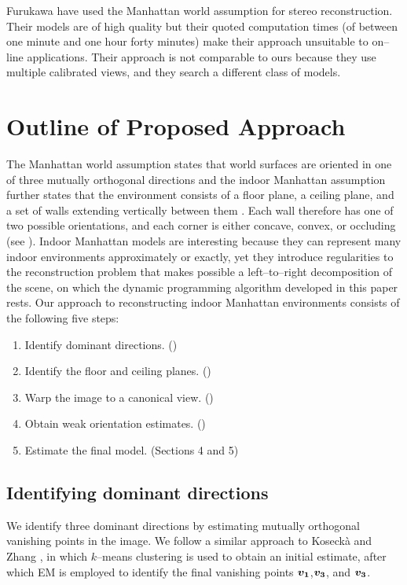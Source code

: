 Furukawa \etal \cite{Furukawa09} have used the Manhattan world
assumption for stereo reconstruction. Their models are of high
quality but their quoted computation times (of between one minute and
one hour forty minutes) make their approach unsuitable to on--line
applications. Their approach is not comparable to ours because they
use multiple calibrated views, and they search a different class of
models.

\section{Outline of Proposed Approach}

The Manhattan world assumption states that world surfaces are oriented
in one of three mutually orthogonal directions \cite{Coughlan99} and
the indoor Manhattan assumption further states that the environment
consists of a floor plane, a ceiling plane, and a set of walls
extending vertically between them \cite{Lee09}. Each wall therefore
has one of two possible orientations, and each corner is either
concave, convex, or occluding (see ). Indoor Manhattan
models are interesting because they can represent many indoor
environments approximately or exactly, yet they introduce regularities
to the reconstruction problem that makes possible a left--to--right
decomposition of the scene, on which the dynamic programming algorithm
developed in this paper rests. Our approach to reconstructing indoor
Manhattan environments consists of the following five steps:
\begin{enumerate}
  \item{Identify dominant directions. ()}
  \item{Identify the floor and ceiling planes. ()}
  \item{Warp the image to a canonical view. ()}
  \item{Obtain weak orientation estimates. ()}
  \item{Estimate the final model. (Sections 4 and 5)}
\end{enumerate}

\subsection{Identifying dominant directions}
\label{sect:vpts}

We identify three dominant directions by estimating mutually
orthogonal vanishing points in the image. We follow a similar approach
to Koseck\`{a} and Zhang \cite{Zhang02}, in which $k$--means
clustering is used to obtain an initial estimate, after which EM is
employed to identify the final vanishing points
$\boldsymbol{v_1}$,$\boldsymbol{v_3}$, and $\boldsymbol{v_3}$.

